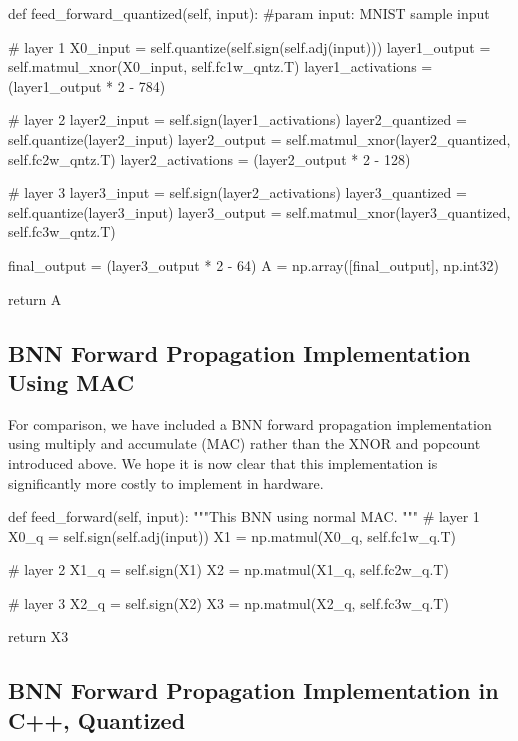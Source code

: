 \begin{python}
def feed_forward_quantized(self, input):
    #param input: MNIST sample input
    
    # layer 1
    X0_input = self.quantize(self.sign(self.adj(input)))
    layer1_output = self.matmul_xnor(X0_input, self.fc1w_qntz.T)
    layer1_activations = (layer1_output * 2 - 784)

    # layer 2
    layer2_input = self.sign(layer1_activations)
    layer2_quantized = self.quantize(layer2_input)
    layer2_output = self.matmul_xnor(layer2_quantized, self.fc2w_qntz.T)
    layer2_activations = (layer2_output * 2 - 128)

    # layer 3
    layer3_input = self.sign(layer2_activations)
    layer3_quantized = self.quantize(layer3_input)
    layer3_output = self.matmul_xnor(layer3_quantized, self.fc3w_qntz.T)

    final_output = (layer3_output * 2 - 64)
    A = np.array([final_output], np.int32)
        
    return A

\end{python}

\subsection{BNN Forward Propagation Implementation Using MAC}

For comparison, we have included a BNN forward propagation implementation using multiply and accumulate (MAC) rather than the XNOR and popcount introduced above. We hope it is now clear that this implementation is significantly more costly to implement in hardware. \\

\begin{python}
def feed_forward(self, input):
     """This BNN using normal MAC.
    """
    # layer 1
    X0_q = self.sign(self.adj(input))
    X1 = np.matmul(X0_q, self.fc1w_q.T)

    # layer 2
    X1_q = self.sign(X1)
    X2 = np.matmul(X1_q, self.fc2w_q.T)

    # layer 3
    X2_q = self.sign(X2)
    X3 = np.matmul(X2_q, self.fc3w_q.T)

    return X3
\end{python}


\subsection{BNN Forward Propagation Implementation in C++, Quantized}

